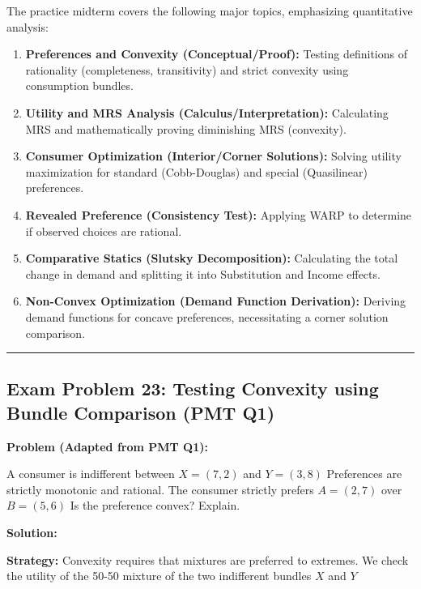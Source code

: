 \documentclass{article}
\begin{document}
The practice midterm covers the following major topics, emphasizing quantitative analysis:

\begin{enumerate}
\item \textbf{Preferences and Convexity (Conceptual/Proof):} Testing definitions of rationality (completeness, transitivity) and strict convexity using consumption bundles.
\item \textbf{Utility and MRS Analysis (Calculus/Interpretation):} Calculating MRS and mathematically proving diminishing MRS (convexity).
\item \textbf{Consumer Optimization (Interior/Corner Solutions):} Solving utility maximization for standard (Cobb-Douglas) and special (Quasilinear) preferences.
\item \textbf{Revealed Preference (Consistency Test):} Applying WARP to determine if observed choices are rational.
\item \textbf{Comparative Statics (Slutsky Decomposition):} Calculating the total change in demand and splitting it into Substitution and Income effects.
\item \textbf{Non-Convex Optimization (Demand Function Derivation):} Deriving demand functions for concave preferences, necessitating a corner solution comparison.
\end{enumerate}

\vspace{1em}\hrule\vspace{1em}

\subsection*{Exam Problem 23: Testing Convexity using Bundle Comparison (PMT Q1)}

\textbf{Problem (Adapted from PMT Q1):}

A consumer is indifferent between $X=(7, 2)$ and $Y=(3, 8)$ Preferences are strictly monotonic and rational. The consumer strictly prefers $A=(2, 7)$ over $B=(5, 6)$ Is the preference convex? Explain.

\textbf{Solution:}

\textbf{Strategy:} Convexity requires that mixtures are preferred to extremes. We check the utility of the 50-50 mixture of the two indifferent bundles $X$ and $Y$
\end{document}
